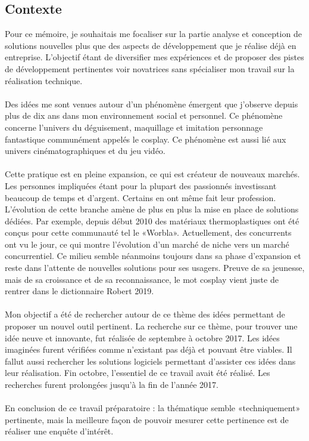 \documentclass[a4paper,12pt]{article}
\begin{document}
\subsection{Contexte}
Pour ce mémoire, je souhaitais me focaliser sur la partie analyse et conception de solutions nouvelles plus que des aspects de développement que je réalise déjà en entreprise. L’objectif étant de diversifier mes expériences et de proposer des pistes de développement pertinentes voir novatrices sans spécialiser mon travail sur la réalisation technique.\\ \\
Des idées me sont venues autour d’un phénomène émergent que j’observe depuis plus de dix ans dans mon environnement social et personnel. Ce phénomène concerne l’univers du déguisement, maquillage et imitation personnage fantastique communément appelés le cosplay. Ce phénomène est aussi lié aux univers cinématographiques et du jeu vidéo.
\\ \\Cette pratique est en pleine expansion, ce qui est créateur de nouveaux marchés. Les personnes impliquées étant pour la plupart des passionnés investissant beaucoup de temps et d'argent. Certains en ont même fait leur profession. L'évolution de cette branche amène de plus en plus la mise en place de solutions dédiées. Par exemple, depuis début 2010 des matériaux thermoplastiques ont été conçus pour cette communauté tel le «Worbla». Actuellement, des concurrents ont vu le jour, ce qui montre l'évolution d'un marché de niche vers un marché concurrentiel. Ce milieu semble néanmoins toujours dans sa phase d'expansion et reste dans l’attente de nouvelles solutions pour ses usagers. Preuve de sa jeunesse, mais de sa croissance et de sa reconnaissance, le mot cosplay vient juste de rentrer dans le dictionnaire Robert 2019. 
\\ \\
Mon objectif a été de rechercher autour de ce thème des idées permettant de proposer un nouvel outil pertinent. La recherche sur ce thème, pour trouver une idée neuve et innovante, fut réalisée de septembre à octobre 2017. Les idées imaginées furent vérifiées comme n’existant pas déjà et pouvant être viables. Il fallut aussi rechercher les solutions logiciels permettant d’assister ces idées dans leur réalisation. Fin octobre, l’essentiel de ce travail avait été réalisé. Les recherches furent prolongées jusqu'à la fin de l’année 2017.\\ \\
En conclusion de ce travail préparatoire  : la thématique semble  «techniquement» pertinente, mais la meilleure façon de pouvoir mesurer cette pertinence est de réaliser une enquête d'intérêt.
\end{document}
